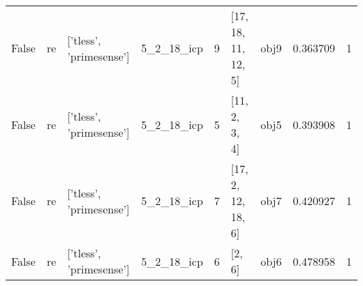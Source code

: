 \documentclass[a4paper,table]{article}
\begin{document}
\begin{adjustbox}{max width=\textwidth}
\begin{tabular}{lllllllrl}
   False &         re &  ['tless', 'primesense'] &  5\_2\_18\_icp &        9 &    [17, 18, 11, 12, 5] &     obj9 &     0.363709 &   1 \\
   False &         re &  ['tless', 'primesense'] &  5\_2\_18\_icp &        5 &          [11, 2, 3, 4] &     obj5 &     0.393908 &   1 \\
   False &         re &  ['tless', 'primesense'] &  5\_2\_18\_icp &        7 &     [17, 2, 12, 18, 6] &     obj7 &     0.420927 &   1 \\
   False &         re &  ['tless', 'primesense'] &  5\_2\_18\_icp &        6 &                 [2, 6] &     obj6 &     0.478958 &   1 \\
\bottomrule
\end{tabular}
\end{adjustbox}
\end{document}
